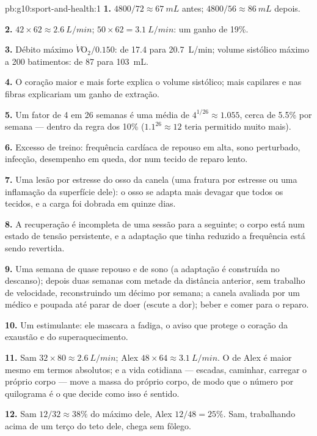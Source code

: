 \begin{solution}{pb:g10:sport-and-health:1}
\textbf{1.} $4800/72 \approx \qty{67}{mL}$ antes; $4800/56 \approx
\qty{86}{mL}$ depois.

\textbf{2.} $42 \times 62 \approx \qty{2.6}{L/min}$; $50 \times 62 =
\qty{3.1}{L/min}$: um ganho de 19\%.

\textbf{3.} Débito máximo $\dot V\!\mathrm{O_2}/0.150$: de \num{17.4}
para \qty{20.7}{L/min}; volume sistólico máximo a 200 batimentos: de
\num{87} para \qty{103}{mL}.

\textbf{4.} O coração maior e mais forte explica o volume sistólico;
mais capilares e  nas fibras explicariam um ganho de
extração.

\textbf{5.} Um fator de 4 em 26 semanas é uma média de $4^{1/26}
\approx 1.055$, cerca de 5.5\% por semana --- dentro da regra dos 10\%
($1.1^{26}
\approx 12$ teria permitido muito mais).

\textbf{6.} Excesso de treino: frequência cardíaca de repouso em alta,
sono perturbado, infecção, desempenho em queda, dor num tecido de
reparo lento.

\textbf{7.} Uma lesão por estresse do osso da canela (uma fratura por
estresse ou uma inflamação da superfície dele): o osso se adapta mais
devagar que todos os tecidos, e a carga foi dobrada em quinze dias.

\textbf{8.} A recuperação é incompleta de uma sessão para a seguinte; o
corpo está num estado de tensão persistente, e a adaptação que tinha
reduzido a frequência está sendo revertida.

\textbf{9.} Uma semana de quase repouso e de sono (a adaptação é
construída no descanso); depois duas semanas com metade da distância
anterior, sem trabalho de velocidade, reconstruindo um décimo por
semana; a canela avaliada por um médico e poupada até parar de doer
(escute a dor); beber e comer para o reparo.

\textbf{10.} Um estimulante: ele mascara a fadiga, o aviso que protege
o coração da exaustão e do superaquecimento.

\textbf{11.} Sam $32 \times 80 \approx \qty{2.6}{L/min}$; Alex $48
\times 64 \approx \qty{3.1}{L/min}$. O de Alex é maior mesmo em termos
absolutos; e a vida cotidiana --- escadas, caminhar, carregar o próprio
corpo --- move a massa do próprio corpo, de modo que o número por
quilograma é o que decide como isso é sentido.

\textbf{12.} Sam $12/32 \approx 38\%$ do máximo dele, Alex $12/48 =
25\%$. Sam, trabalhando acima de um terço do teto dele, chega sem
fôlego.


\end{solution}
